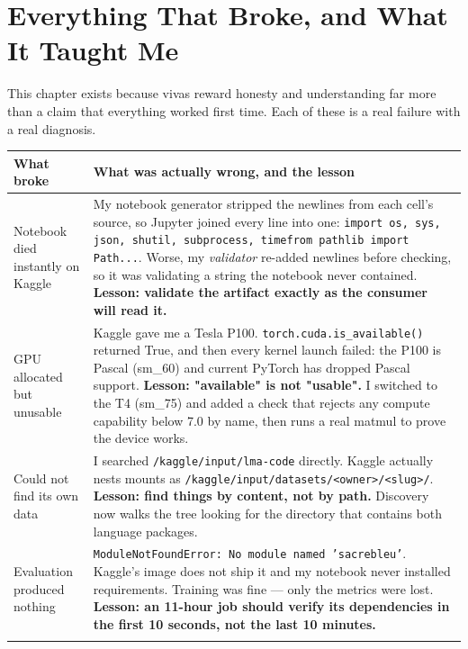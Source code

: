 \documentclass[11pt]{report}
\newcommand{\p}[1]{\texttt{#1}}
\begin{document}
\chapter{Everything That Broke, and What It Taught Me}

This chapter exists because vivas reward honesty and understanding far more than
a claim that everything worked first time. Each of these is a real failure with a
real diagnosis.

\begin{center}
\begin{longtable}{p{}p{}}
\toprule
\textbf{What broke} & \textbf{What was actually wrong, and the lesson} \\
\midrule
\endhead
Notebook died instantly on Kaggle &
My notebook generator stripped the newlines from each cell's source, so Jupyter
joined every line into one: \p{import os, sys, json, shutil, subprocess,
timefrom pathlib import Path...}. Worse, my \emph{validator} re-added newlines
before checking, so it was validating a string the notebook never contained.
\textbf{Lesson: validate the artifact exactly as the consumer will read it.} \\
\addlinespace
GPU allocated but unusable &
Kaggle gave me a Tesla P100. \p{torch.cuda.is\_available()} returned True, and
then every kernel launch failed: the P100 is Pascal (sm\_60) and current PyTorch
has dropped Pascal support. \textbf{Lesson: "available" is not "usable".} I
switched to the T4 (sm\_75) and added a check that rejects any compute capability
below 7.0 by name, then runs a real matmul to prove the device works. \\
\addlinespace
Could not find its own data &
I searched \p{/kaggle/input/lma-code} directly. Kaggle actually nests mounts as
\p{/kaggle/input/datasets/<owner>/<slug>/}. \textbf{Lesson: find things by
content, not by path.} Discovery now walks the tree looking for the directory
that contains both language packages. \\
\addlinespace
Evaluation produced nothing &
\p{ModuleNotFoundError: No module named 'sacrebleu'}. Kaggle's image does not
ship it and my notebook never installed requirements. Training was fine --- only
the metrics were lost. \textbf{Lesson: an 11-hour job should verify its
dependencies in the first 10 seconds, not the last 10 minutes.} \\
\addlinespace

\end{longtable}
\end{center}
\end{document}
